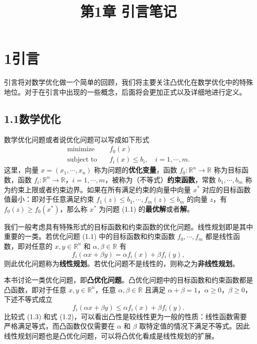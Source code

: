 \documentclass[UTF8,12pt,a4paper,fontset=fandol]{ctexart}
\title{第1章 引言笔记}
\author{}
\date{}
\begin{document}
\maketitle

\section*{1\quad 引言}

引言将对数学优化做一个简单的回顾，我们将主要关注凸优化在数学优化中的特殊地位。对于在引言中出现的一些概念，后面将会更加正式以及详细地进行定义。

\subsection*{1.1\quad 数学优化}

数学优化问题或者说优化问题可以写成如下形式
\begin{equation}
\begin{aligned}
  \text{minimize}\quad & f_0(x)\\
  \text{subject to}\quad & f_i(x)\le b_i,\quad i=1,\cdots,m.
\end{aligned}
\tag{1.1}
\end{equation}
这里，向量 $x=(x_1,\cdots,x_n)$ 称为问题的\textbf{优化变量}，函数 $f_0:\mathbb{R}^n\to\mathbb{R}$ 称为目标函数，函数 $f_i:\mathbb{R}^n\to\mathbb{R}$，$i=1,\cdots,m$，被称为（不等式）\textbf{约束函数}，常数 $b_1,\cdots,b_m$ 称为约束上限或者约束边界。如果在所有满足约束的向量中向量 $x^*$ 对应的目标函数值最小：即对于任意满足约束 $f_1(z)\le b_1,\cdots,f_m(z)\le b_m$ 的向量 $z$，有 $f_0(z)\ge f_0(x^*)$，那么称 $x^*$ 为问题 (1.1) 的\textbf{最优解}或者\textbf{解}。

我们一般考虑具有特殊形式的目标函数和约束函数的优化问题。线性规划即是其中重要的一类。若优化问题 (1.1) 中的目标函数和约束函数 $f_0,\cdots,f_m$ 都是线性函数，即对任意的 $x,y\in\mathbb{R}^n$ 和 $\alpha,\beta\in\mathbb{R}$ 有
\begin{equation}
  f_i(\alpha x+\beta y)=\alpha f_i(x)+\beta f_i(y),
\tag{1.2}
\end{equation}
则此优化问题称为\textbf{线性规划}。若优化问题不是线性的，则称之为\textbf{非线性规划}。

本书讨论一类优化问题，即\textbf{凸优化问题}。凸优化问题中的目标函数和约束函数都是凸函数，即对于任意 $x,y\in\mathbb{R}^n$，任意 $\alpha,\beta\in\mathbb{R}$ 且满足 $\alpha+\beta=1$，$\alpha\ge0$，$\beta\ge0$，下述不等式成立
\begin{equation}
  f_i(\alpha x+\beta y)\le \alpha f_i(x)+\beta f_i(y).
\tag{1.3}
\end{equation}
比较式 (1.3) 和式 (1.2)，可以看出凸性是较线性更为一般的性质：线性函数需要严格满足等式，而凸函数仅仅需要在 $\alpha$ 和 $\beta$ 取特定值的情况下满足不等式。因此线性规划问题也是凸优化问题，可以将凸优化看成是线性规划的扩展。
\end{document}
